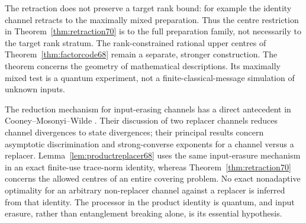The retraction does not preserve a target rank bound: for example the
identity channel retracts to the maximally mixed preparation. Thus the
centre restriction in Theorem~\ref{thm:retraction70} is to the full
preparation family, not necessarily to the target rank stratum. The
rank-constrained rational upper centres of
Theorem~\ref{thm:factorcode68} remain a separate, stronger construction.
The theorem concerns the geometry of mathematical descriptions. Its
maximally mixed test is a quantum experiment, not a finite-classical-message
simulation of unknown inputs.

The reduction mechanism for input-erasing channels has a direct antecedent
in Cooney--Mosonyi--Wilde \cite{CMW70}. Their discussion of two replacer
channels reduces channel divergences to state divergences; their principal
results concern asymptotic discrimination and strong-converse exponents
for a channel versus a replacer. Lemma~\ref{lem:productreplacer68} uses the
same input-erasure mechanism in an exact finite-use trace-norm identity,
whereas Theorem~\ref{thm:retraction70} concerns the allowed centres of an
entire covering problem. No exact nonadaptive optimality for an arbitrary
non-replacer channel against a replacer is inferred from that identity.
The processor in the product identity is quantum, and input erasure,
rather than entanglement breaking alone, is its essential hypothesis.
